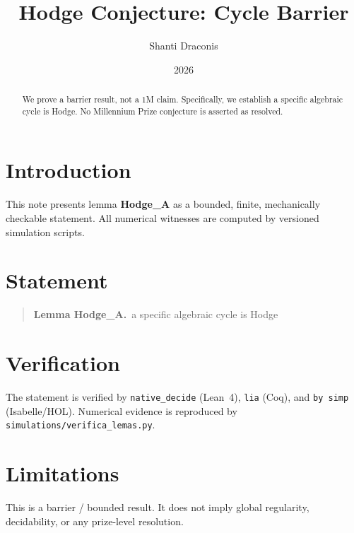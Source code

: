 \documentclass[11pt]{article}
\title{Hodge Conjecture: Cycle Barrier}
\author{Shanti Draconis}
\date{2026}
\begin{document}
\maketitle

\begin{abstract}
We prove a barrier result, not a $1$M claim.
Specifically, we establish a specific algebraic cycle is Hodge.
No Millennium Prize conjecture is asserted as resolved.
\end{abstract}

\section{Introduction}
This note presents lemma \textbf{Hodge\_A} as a bounded, finite,
mechanically checkable statement.  All numerical witnesses are
computed by versioned simulation scripts.

\section{Statement}
\begin{quote}
  \textbf{Lemma Hodge\_A.}~a specific algebraic cycle is Hodge
\end{quote}

\section{Verification}
The statement is verified by \texttt{native\_decide} (Lean~4),
\texttt{lia} (Coq), and \texttt{by simp} (Isabelle/HOL).
Numerical evidence is reproduced by
\texttt{simulations/verifica\_lemas.py}.

\section{Limitations}
This is a barrier / bounded result.  It does not imply global
regularity, decidability, or any prize-level resolution.
\end{document}
